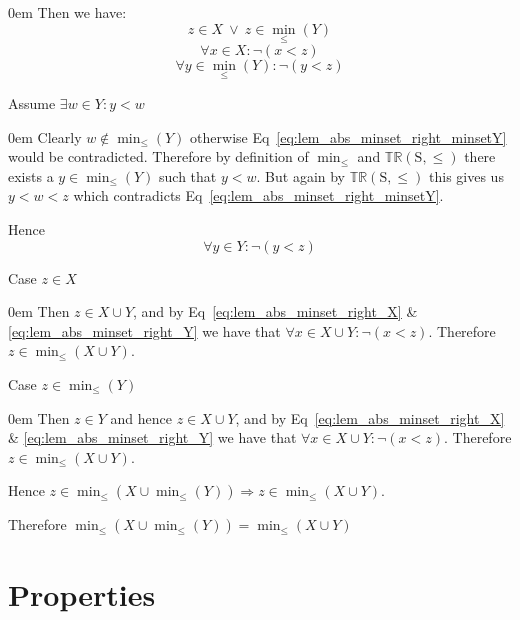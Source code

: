 \documentclass[10pt]{article}
\newcommand{\propname}[1]{{\mathbb{#1}}}
\newenvironment{ind}[0]{\begin{addmargin}[1em]{0em}\vspace{0.5em}}{\end{addmargin}\vspace{0.5em}}
\begin{document}
\begin{ind}
Then we have:
\begin{equation}
z \in X \ \vee \ z \in \min_\leq(Y)
\end{equation}
\begin{equation} \label{eq:lem_abs_minset_right_X}
\forall x \in X : \neg (x < z)
\end{equation}
\begin{equation} \label{eq:lem_abs_minset_right_minsetY}
\forall y \in \min_\leq(Y) : \neg (y < z)
\end{equation}

Assume $\exists w \in Y : y < w$
\begin{ind}
Clearly $w \notin \min_\leq(Y)$ otherwise Eq~\ref{eq:lem_abs_minset_right_minsetY} would be contradicted. Therefore by definition of $\min_\leq$ and $\propname{TR}(\mathrm{S, \leq})$ there exists a $y \in \min_\leq(Y)$ such that $y < w$. But again by $\propname{TR}(\mathrm{S, \leq})$ this gives us $y < w < z$ which contradicts Eq~\ref{eq:lem_abs_minset_right_minsetY}.
\end{ind}
Hence
\begin{equation} \label{eq:lem_abs_minset_right_Y}
\forall y \in Y : \neg (y < z)
\end{equation}

Case $z \in X$
\begin{ind}
Then $z \in X \cup Y$, and by Eq~\ref{eq:lem_abs_minset_right_X} \& \ref{eq:lem_abs_minset_right_Y} we have that $\forall x \in X \cup Y : \neg (x < z)$. Therefore $z \in \min_\leq(X \cup Y)$.
\end{ind}

Case $z \in \min_\leq(Y)$
\begin{ind}
Then $z \in Y$ and hence $z \in X \cup Y$, and by Eq~\ref{eq:lem_abs_minset_right_X} \& \ref{eq:lem_abs_minset_right_Y} we have that $\forall x \in X \cup Y : \neg (x < z)$. Therefore $z \in \min_\leq(X \cup Y)$.
\end{ind}
Hence $z \in \min_\leq(X \cup \min_\leq(Y)) \Rightarrow z \in \min_\leq(X \cup Y)$.
\end{ind}


\vspace{1em}

Therefore $\min_\leq(X \cup \min_\leq(Y)) = \min_\leq(X \cup Y)$

\section{Properties}
\end{document}
